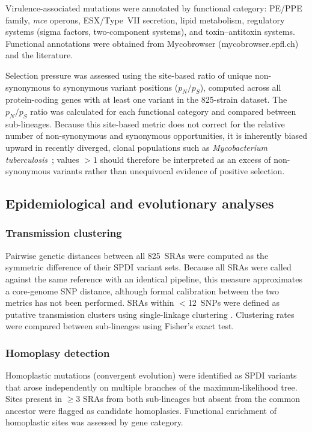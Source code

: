 \documentclass[11pt,a4paper]{article}
\newcommand{\mtb}{\textit{Mycobacterium tuberculosis}}
\begin{document}
Virulence-associated mutations were annotated by functional category:
PE/PPE family, \textit{mce} operons, ESX/Type~VII secretion, lipid
metabolism, regulatory systems (sigma factors, two-component systems),
and toxin--antitoxin systems.  Functional annotations were obtained from
Mycobrowser (mycobrowser.epfl.ch) and the literature.

Selection pressure was assessed using the site-based ratio of unique
non-synonymous to synonymous variant positions ($p_N/p_S$), computed across
all protein-coding genes with at least one variant in the 825-strain
dataset.  The $p_N/p_S$ ratio was calculated for each functional category
and compared between sub-lineages.
Because this site-based metric does not correct for the relative
number of non-synonymous and synonymous opportunities, it is inherently
biased upward in recently diverged, clonal populations such as
\mtb{}~\cite{rocha2006,kryazhimskiy2008}; values $>1$ should therefore
be interpreted as an excess of non-synonymous variants rather than
unequivocal evidence of positive selection.

\subsection{Epidemiological and evolutionary analyses}

\subsubsection{Transmission clustering}

Pairwise genetic distances between all 825~SRAs were computed as the
symmetric difference of their SPDI variant sets.  Because all SRAs
were called against the same reference with an identical pipeline, this
measure approximates a core-genome SNP distance, although formal
calibration between the two metrics has not been performed.
SRAs within $<$12~SNPs were defined as putative transmission clusters
using single-linkage clustering \cite{walker2013}.  Clustering rates were compared between
sub-lineages using Fisher's exact test.

\subsubsection{Homoplasy detection}

Homoplastic mutations (convergent evolution) were identified as SPDI
variants that arose independently on multiple branches of the maximum-likelihood tree.
Sites present in $\geq$3 SRAs from both sub-lineages but absent from
the common ancestor were flagged as candidate homoplasies.  Functional
enrichment of homoplastic sites was assessed by gene category.
\end{document}
